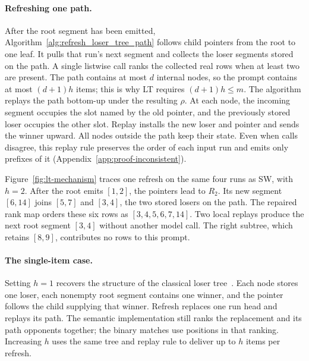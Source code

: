 \paragraph{Refreshing one path.}
After the root segment has been emitted, Algorithm~\ref{alg:refresh_loser_tree_path} follows child pointers from the root to one leaf. It pulls that run's next segment and collects the loser segments stored on the path. A single listwise call ranks the collected real rows when at least two are present. The path contains at most $d$ internal nodes, so the prompt contains at most $(d+1)h$ items; this is why LT requires $(d+1)h\le m$. The algorithm replays the path bottom-up under the resulting $\rho$. At each node, the incoming segment occupies the slot named by the old pointer, and the previously stored loser occupies the other slot. Replay installs the new loser and pointer and sends the winner upward. All nodes outside the path keep their state. Even when calls disagree, this replay rule preserves the order of each input run and emits only prefixes of it (Appendix~\ref{app:proof-inconsistent}).



Figure~\ref{fig:lt-mechanism} traces one refresh on the same four runs as SW, with $h=2$. After the root emits $[1,2]$, the pointers lead to $R_2$. Its new segment $[6,14]$ joins $[5,7]$ and $[3,4]$, the two stored losers on the path. The repaired rank map orders these six rows as $[3,4,5,6,7,14]$. Two local replays produce the next root segment $[3,4]$ without another model call. The right subtree, which retains $[8,9]$, contributes no rows to this prompt.

\paragraph{The single-item case.}
Setting $h=1$ recovers the structure of the classical loser tree~\cite{DBLP:journals/csur/Graefe06}. Each node stores one loser, each nonempty root segment contains one winner, and the pointer follows the child supplying that winner. Refresh replaces one run head and replays its path. The semantic implementation still ranks the replacement and its path opponents together; the binary matches use positions in that ranking. Increasing $h$ uses the same tree and replay rule to deliver up to $h$ items per refresh.


